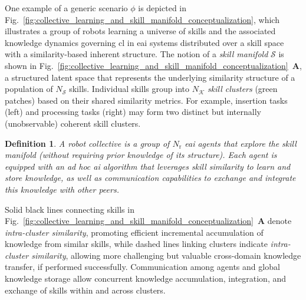 \documentclass[12pt]{article}
\renewcommand{\emph}[1]{\textit{#1}}
\newtheorem{definition}{Definition}
\begin{document}
One example of a generic scenario $\phi$ is depicted in Fig.~\ref{fig:collective_learning_and_skill_manifold_conceptualization}, which illustrates a group of robots learning a universe of skills and the associated knowledge dynamics governing \ac{cl} in \ac{eai} systems distributed over a skill space with a similarity-based inherent structure. The notion of a \textit{skill manifold} $\mathcal{S}$ is shown in Fig.~\ref{fig:collective_learning_and_skill_manifold_conceptualization}~\textbf{A}, a structured latent space that represents the underlying similarity structure of a population of $N_\mathcal{S}$ skills. Individual skills group into $N_\mathcal{K}$ \emph{skill clusters} (green patches) based on their shared similarity metrics. For example, insertion tasks (left) and processing tasks (right) may form two distinct but internally (unobservable) coherent skill clusters.
 

\begin{definition}\label{def:robot_collective}
	A \emph{robot collective} is a group of $N_\mathrm{r}$ \ac{eai} agents that explore the skill manifold (without requiring prior knowledge of its structure). Each agent is equipped with an ad hoc \ac{ai} algorithm that leverages skill similarity to learn and store knowledge, as well as communication capabilities to exchange and integrate this knowledge with other peers.
\end{definition}

\noindent Solid black lines connecting skills in Fig.~\ref{fig:collective_learning_and_skill_manifold_conceptualization}~\textbf{A} denote \textit{intra-cluster similarity}, promoting efficient incremental accumulation of knowledge from similar skills, while dashed lines linking clusters indicate \textit{intra-cluster similarity}, allowing more challenging but valuable cross-domain knowledge transfer, if performed successfully. Communication among agents and global knowledge storage allow concurrent knowledge accumulation, integration, and exchange of skills within and across clusters.
\end{document}
